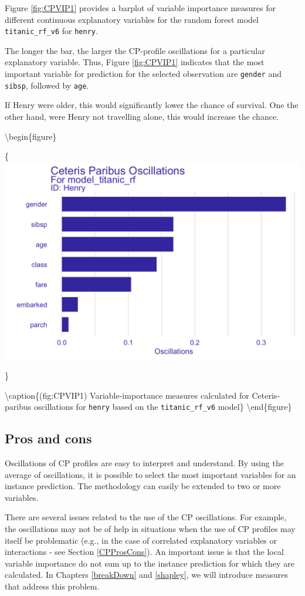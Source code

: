 \documentclass[12pt,]{krantz}
\theoremstyle{definition}
\theoremstyle{definition}
\theoremstyle{definition}
\theoremstyle{remark}
\begin{document}
Figure \ref{fig:CPVIP1} provides a barplot of variable importance
measures for different continuous explanatory variables for the random
forest model \texttt{titanic\_rf\_v6} for \texttt{henry}.

The longer the bar, the larger the CP-profile oscillations for a
particular explanatory variable. Thus, Figure \ref{fig:CPVIP1} indicates
that the most important variable for prediction for the selected
observation are \texttt{gender} and \texttt{sibsp}, followed by
\texttt{age}.

If Henry were older, this would significantly lower the chance of
survival. One the other hand, were Henry not travelling alone, this
would increase the chance.

\textbackslash{}begin\{figure\}

\{\centering \includegraphics[width=0.75\linewidth]{figure/oscillations_all_rf_plot}

\}

\textbackslash{}caption\{(fig:CPVIP1) Variable-importance measures
calculated for Ceteris-paribus oscillations for \texttt{henry} based on
the \texttt{titanic\_rf\_v6} model\}\label{fig:CPVIP1}
\textbackslash{}end\{figure\}

\hypertarget{CPOscProsCons}{%
\subsection{Pros and cons}\label{CPOscProsCons}}

Oscillations of CP profiles are easy to interpret and understand. By
using the average of oscillations, it is possible to select the most
important variables for an instance prediction. The methodology can
easily be extended to two or more variables.

There are several issues related to the use of the CP oscillations. For
example, the oscillations may not be of help in situations when the use
of CP profiles may itself be problematic (e.g., in the case of
correlated explanatory variables or interactions - see Section
\ref{CPProsCons}). An important issue is that the local variable
importance do not sum up to the instance prediction for which they are
calculated. In Chapters \ref{breakDown} and \ref{shapley}, we will
introduce measures that address this problem.
\end{document}
